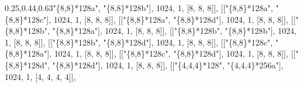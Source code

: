 \documentclass[
  10pt,
  letterpaper,
]{article}
\newenvironment{Shaded}{}{}
\newcommand{\FloatTok}[1]{\textcolor[rgb]{0.25,0.63,0.44}{#1}}
\newcommand{\NormalTok}[1]{#1}
\newcommand{\OperatorTok}[1]{\textcolor[rgb]{0.40,0.40,0.40}{#1}}
\newcommand{\StringTok}[1]{\textcolor[rgb]{0.25,0.44,0.63}{#1}}
\begin{document}
\begin{Shaded}
\begin{Highlighting}[]
\NormalTok{[[}\StringTok{"\{8,8\}*128a"}\OperatorTok{,} \StringTok{"\{8,8\}*128b"}\NormalTok{]}\OperatorTok{,} \FloatTok{1024}\OperatorTok{,} \FloatTok{1}\OperatorTok{,}\NormalTok{ [}\FloatTok{8}\OperatorTok{,} \FloatTok{8}\OperatorTok{,} \FloatTok{8}\NormalTok{]]}\OperatorTok{,}
\NormalTok{[[}\StringTok{"\{8,8\}*128a"}\OperatorTok{,} \StringTok{"\{8,8\}*128c"}\NormalTok{]}\OperatorTok{,} \FloatTok{1024}\OperatorTok{,} \FloatTok{1}\OperatorTok{,}\NormalTok{ [}\FloatTok{8}\OperatorTok{,} \FloatTok{8}\OperatorTok{,} \FloatTok{8}\NormalTok{]]}\OperatorTok{,}
\NormalTok{[[}\StringTok{"\{8,8\}*128a"}\OperatorTok{,} \StringTok{"\{8,8\}*128d"}\NormalTok{]}\OperatorTok{,} \FloatTok{1024}\OperatorTok{,} \FloatTok{1}\OperatorTok{,}\NormalTok{ [}\FloatTok{8}\OperatorTok{,} \FloatTok{8}\OperatorTok{,} \FloatTok{8}\NormalTok{]]}\OperatorTok{,}
\NormalTok{[[}\StringTok{"\{8,8\}*128b"}\OperatorTok{,} \StringTok{"\{8,8\}*128a"}\NormalTok{]}\OperatorTok{,} \FloatTok{1024}\OperatorTok{,} \FloatTok{1}\OperatorTok{,}\NormalTok{ [}\FloatTok{8}\OperatorTok{,} \FloatTok{8}\OperatorTok{,} \FloatTok{8}\NormalTok{]]}\OperatorTok{,}
\NormalTok{[[}\StringTok{"\{8,8\}*128b"}\OperatorTok{,} \StringTok{"\{8,8\}*128b"}\NormalTok{]}\OperatorTok{,} \FloatTok{1024}\OperatorTok{,} \FloatTok{1}\OperatorTok{,}\NormalTok{ [}\FloatTok{8}\OperatorTok{,} \FloatTok{8}\OperatorTok{,} \FloatTok{8}\NormalTok{]]}\OperatorTok{,}
\NormalTok{[[}\StringTok{"\{8,8\}*128b"}\OperatorTok{,} \StringTok{"\{8,8\}*128d"}\NormalTok{]}\OperatorTok{,} \FloatTok{1024}\OperatorTok{,} \FloatTok{1}\OperatorTok{,}\NormalTok{ [}\FloatTok{8}\OperatorTok{,} \FloatTok{8}\OperatorTok{,} \FloatTok{8}\NormalTok{]]}\OperatorTok{,}
\NormalTok{[[}\StringTok{"\{8,8\}*128c"}\OperatorTok{,} \StringTok{"\{8,8\}*128a"}\NormalTok{]}\OperatorTok{,} \FloatTok{1024}\OperatorTok{,} \FloatTok{1}\OperatorTok{,}\NormalTok{ [}\FloatTok{8}\OperatorTok{,} \FloatTok{8}\OperatorTok{,} \FloatTok{8}\NormalTok{]]}\OperatorTok{,}
\NormalTok{[[}\StringTok{"\{8,8\}*128c"}\OperatorTok{,} \StringTok{"\{8,8\}*128d"}\NormalTok{]}\OperatorTok{,} \FloatTok{1024}\OperatorTok{,} \FloatTok{1}\OperatorTok{,}\NormalTok{ [}\FloatTok{8}\OperatorTok{,} \FloatTok{8}\OperatorTok{,} \FloatTok{8}\NormalTok{]]}\OperatorTok{,}
\NormalTok{[[}\StringTok{"\{8,8\}*128d"}\OperatorTok{,} \StringTok{"\{8,8\}*128d"}\NormalTok{]}\OperatorTok{,} \FloatTok{1024}\OperatorTok{,} \FloatTok{1}\OperatorTok{,}\NormalTok{ [}\FloatTok{8}\OperatorTok{,} \FloatTok{8}\OperatorTok{,} \FloatTok{8}\NormalTok{]]}\OperatorTok{,}
\NormalTok{[[}\StringTok{"\{4,4,4\}*128"}\OperatorTok{,} \StringTok{"\{4,4,4\}*256a"}\NormalTok{]}\OperatorTok{,} \FloatTok{1024}\OperatorTok{,} \FloatTok{1}\OperatorTok{,}\NormalTok{ [}\FloatTok{4}\OperatorTok{,} \FloatTok{4}\OperatorTok{,} \FloatTok{4}\OperatorTok{,} \FloatTok{4}\NormalTok{]]}\OperatorTok{,}

\end{Highlighting}
\end{Shaded}
\end{document}
